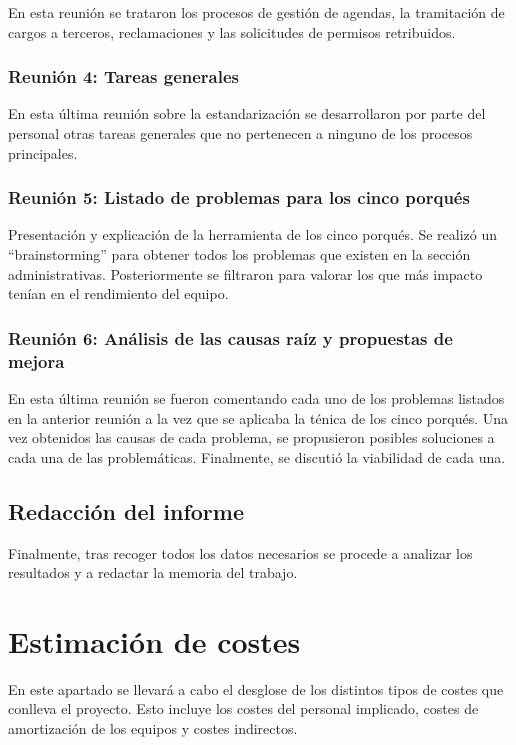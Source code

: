 En esta reunión se trataron los procesos de gestión de agendas, la tramitación de cargos a terceros, reclamaciones y las solicitudes de permisos retribuidos.

\subsubsection{Reunión 4: Tareas generales}

En esta última reunión sobre la estandarización se desarrollaron por parte del personal otras tareas generales que no pertenecen a ninguno de los procesos principales.

\subsubsection{Reunión 5: Listado de problemas para los cinco porqués}

Presentación y explicación de la herramienta de los cinco porqués.
Se realizó un ``brainstorming'' para obtener todos los problemas que existen en la sección administrativas.
Posteriormente se filtraron para valorar los que más impacto tenían en el rendimiento del equipo.

\subsubsection{Reunión 6: Análisis de las causas raíz y propuestas de mejora}

En esta última reunión se fueron comentando cada uno de los problemas listados en la anterior reunión a la vez que se aplicaba la ténica de los cinco porqués.
Una vez obtenidos las causas de cada problema, se propusieron posibles soluciones a cada una de las problemáticas.
Finalmente, se discutió la viabilidad de cada una.

\subsection{Redacción del informe}

Finalmente, tras recoger todos los datos necesarios se procede a analizar los resultados y a redactar la memoria del trabajo. 

\section{Estimación de costes}

En este apartado se llevará a cabo el desglose de los distintos tipos de costes que conlleva el proyecto. Esto incluye los costes del personal implicado, costes de amortización de los equipos y costes indirectos.

